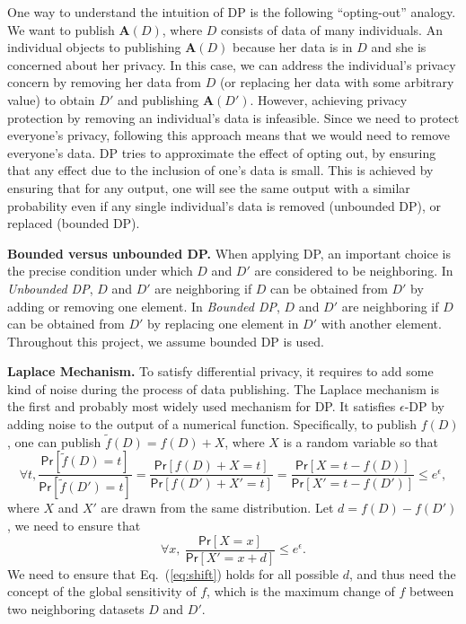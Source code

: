 \documentclass{article}
\renewcommand{\AA}{\mathbf{A}}
\renewcommand{\Pr}[1]{\ensuremath{\mathsf{Pr}\left[#1\right]}\xspace}
\newcommand{\Data}{\ensuremath{D}\xspace}
\begin{document}
One way to understand the intuition of DP is the following ``opting-out'' analogy.  We want to publish $\AA(\Data)$, where $\Data$ consists of data of many individuals.  An individual objects to publishing $\AA(\Data)$ because her data is in $\Data$ and she is concerned about her privacy.  In this case, we can address the individual's privacy concern by removing her data from $\Data$ (or replacing her data with some arbitrary value) to obtain $\Data'$ and publishing $\AA(\Data')$.  However, achieving privacy protection by removing an individual's data is infeasible.  Since we need to protect everyone's privacy, following this approach means that we would need to remove everyone's data.  DP tries to approximate the effect of opting out, by ensuring that any effect due
to the inclusion of one's data is small.  This is achieved by ensuring that for any output, one will see the same output with a similar probability even if any single individual's data is removed (unbounded DP), or replaced (bounded DP).

\noindent\textbf{Bounded versus unbounded DP.}
 When applying DP, an important choice is the precise condition under which $\Data$ and $\Data'$ are considered to be neighboring.  In \emph{Unbounded DP}, $\Data$ and $\Data'$ are neighboring if $\Data$ can be obtained from $\Data'$ by adding or removing one element.  In \emph{Bounded DP}, $\Data$ and $\Data'$ are neighboring if $\Data$ can be obtained from $\Data'$ by replacing one element in $\Data'$ with another element.  Throughout this project, we assume bounded DP is used.
 
\noindent\textbf{Laplace Mechanism.}
To satisfy differential privacy, it requires to add some kind of noise during the process of data publishing.  The Laplace mechanism is the first and probably most widely used mechanism for DP.  It satisfies $\epsilon$-DP by adding noise to the output of a numerical function.  Specifically, to publish $f(\Data)$, one can publish $\tilde{f}(\Data)=f(\Data)+X$, where $X$ is a random variable so that
$$\forall{t}, \frac{\Pr{\tilde{f}(\Data) = t}}{\Pr{\tilde{f}(\Data') = t}} = \frac{\Pr{f(\Data) + X = t}}{\Pr{f(\Data') + X' = t}}
= \frac{\Pr{X=t-f(\Data)}}{\Pr{X'=t-f(\Data')}}  \leq e^{\epsilon},$$
where $X$ and $X'$ are drawn from the same distribution.  Let $d=f(\Data)-f(\Data')$, we need to ensure that
\begin{equation}
\forall{x},\: \frac{\Pr{X = x}}{\Pr{X' = x + d}} \leq e^{\epsilon}.  \label{eq:shift}
\end{equation}
We need to ensure that Eq.~(\ref{eq:shift}) holds for all possible $d$, and thus need the concept of the global sensitivity of $f$, which is the maximum change of $f$ between two neighboring datasets $D$ and $D'$.
\end{document}
